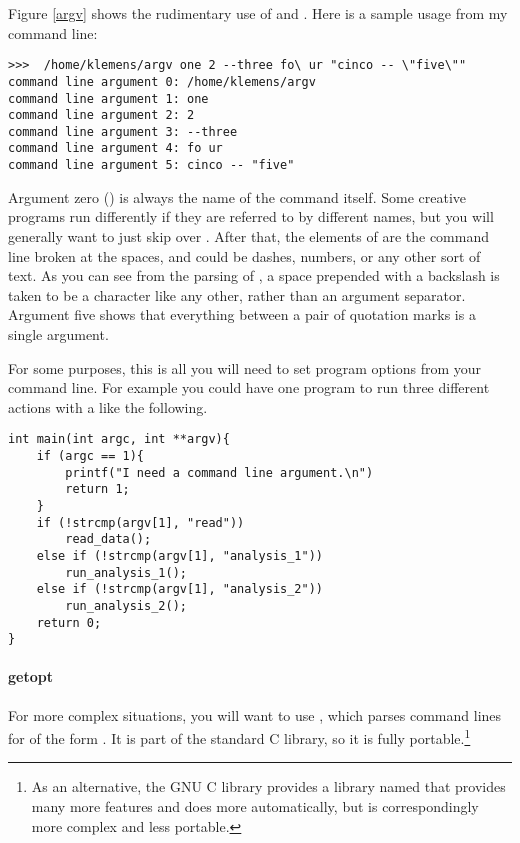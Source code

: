 Figure \ref{argv} shows the rudimentary use of  and .
Here is a sample usage from my command line:
\begin{lstlisting}
>>>  /home/klemens/argv one 2 --three fo\ ur "cinco -- \"five\""
command line argument 0: /home/klemens/argv
command line argument 1: one
command line argument 2: 2
command line argument 3: --three
command line argument 4: fo ur
command line argument 5: cinco -- "five"
\end{lstlisting}
Argument zero () is always the name of the command itself.
Some creative programs run differently if they are referred to by
different names, but you will generally want to just skip over .
After that, the elements of  are the command line broken at
the spaces, and could be dashes, numbers, or any other sort of text. As
you can see from the parsing of , a space prepended
with a backslash is taken to be a character like any other, rather than an
argument separator. Argument five shows that everything between a pair
of quotation marks is a single argument.

For some purposes, this is all you will need to set program options from your
command line. For example you could have one program to run three
different actions with a  like the following.
\begin{lstlisting}
int main(int argc, int **argv){
    if (argc == 1){
        printf("I need a command line argument.\n")
        return 1;
    }
    if (!strcmp(argv[1], "read"))
        read_data();
    else if (!strcmp(argv[1], "analysis_1"))
        run_analysis_1();
    else if (!strcmp(argv[1], "analysis_2"))
        run_analysis_2();
    return 0;
}
\end{lstlisting}

\lstset{numbers=left, numberstyle=\scshape}
\lstset{numbers=none}

\paragraph{getopt}
For more complex situations, you will want to use , which
parses command lines for  of the form .  It is
part of the standard C library, so it is fully portable.\footnote{As
an alternative, the GNU C library provides a library named 
that provides many more features and does more automatically, but is
correspondingly more complex and less portable.} 

